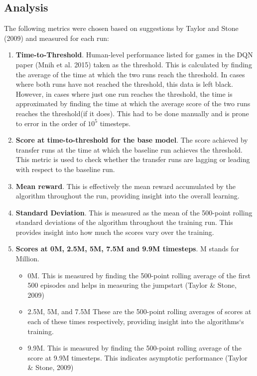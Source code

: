 \subsection*{Analysis}
The following metrics were chosen based on suggestions by Taylor and Stone (2009) and measured for each run: 
\begin{enumerate}
	\item \textbf{Time-to-Threshold}. Human-level performance listed for games in the DQN paper (Mnih et al. 2015) taken as the threshold. This is calculated by finding the average of the time at which the two runs reach the threshold. In cases where both runs have not reached the threshold, this data is left black. However, in cases where just one run reaches the threshold, the time is approximated by finding the time at which the average score of the two runs reaches the threshold(if it does). This had to be done manually and is prone to error in the order of $10^{5}$ timesteps.
	\item \textbf{Score at time-to-threshold for the base model}. The score achieved by transfer runs at the time at which the baseline run achieves the threshold. This metric is used to check whether the transfer runs are lagging or leading with respect to the baseline run.
	\item \textbf{Mean reward}. This is effectively the mean reward accumulated by the algorithm throughout the run, providing insight into the overall learning.
	\item \textbf{Standard Deviation}. This is measured as the mean of the 500-point rolling standard deviations of the algorithm throughout the training run. This provides insight into how much the scores vary over the training.
	\item \textbf{Scores at 0M, 2.5M, 5M, 7.5M and 9.9M timesteps}. M stands for Million.
	\begin{itemize}
		\item 0M. This is measured by finding the 500-point rolling average of the first 500 episodes and helps in measuring the jumpstart (Taylor \& Stone, 2009)
		\item 2.5M, 5M, and 7.5M These are the 500-point rolling averages of scores at each of these times respectively, providing insight into the algorithms`s training.
		\item 9.9M. This is measured by finding the 500-point rolling average of the score at 9.9M timesteps. This indicates asymptotic performance (Taylor \& Stone, 2009)
	\end{itemize}
\end{enumerate}

